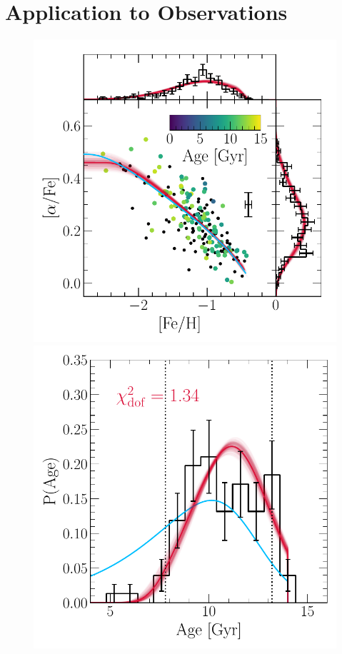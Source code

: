 \documentclass[ms.tex]{subfiles}
\begin{document}
\section{Application to Observations}
\label{sec:h3}

\begin{figure}
\centering
\includegraphics[scale = 0.5]{gsefit_afe_feh.pdf}
\includegraphics[scale = 0.42]{gsefit_agedist.pdf}

\end{figure}
\end{document}
